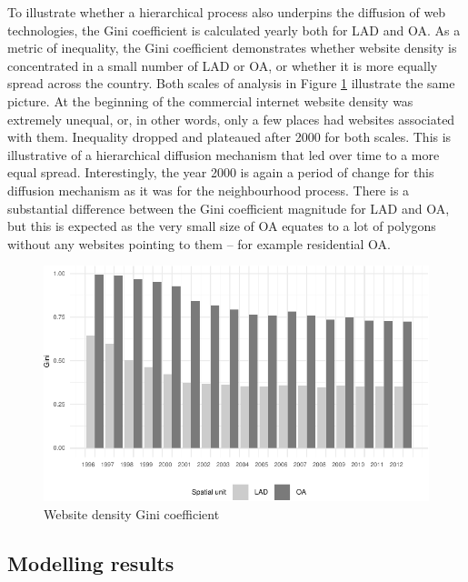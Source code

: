 \documentclass[
  authoryear,
  preprint,
  3p]{elsarticle}
\begin{document}
To illustrate whether a hierarchical process also underpins the
diffusion of web technologies, the Gini coefficient is calculated yearly
both for LAD and OA. As a metric of inequality, the Gini coefficient
demonstrates whether website density is concentrated in a small number
of LAD or OA, or whether it is more equally spread across the country.
Both scales of analysis in Figure \ref{gini} illustrate the same
picture. At the beginning of the commercial internet website density was
extremely unequal, or, in other words, only a few places had websites
associated with them. Inequality dropped and plateaued after 2000 for
both scales. This is illustrative of a hierarchical diffusion mechanism
that led over time to a more equal spread. Interestingly, the year 2000
is again a period of change for this diffusion mechanism as it was for
the neighbourhood process. There is a substantial difference between the
Gini coefficient magnitude for LAD and OA, but this is expected as the
very small size of OA equates to a lot of polygons without any websites
pointing to them -- for example residential OA.

\begin{figure}[H]

{\centering \includegraphics[width=1\textwidth,height=\textheight]{tranos2023_files/figure-pdf/gini-1.pdf}

}

\caption{\label{gini}Website density Gini coefficient}

\end{figure}%

\subsection{Modelling results}\label{modelling-results}
\end{document}
